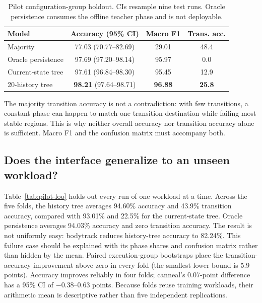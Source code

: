 \documentclass[conference,10pt]{IEEEtran}
\begin{document}
\begin{table}[t]
\centering
\caption{Pilot configuration-group holdout. CIs resample nine test runs. Oracle
persistence consumes the offline teacher phase and is not deployable.}
\label{tab:pilot-main}
\footnotesize
\begin{tabular}{lccc}
\toprule
Model & Accuracy (95\% CI) & Macro F1 & Trans. acc. \\
\midrule
Majority & 77.03 (70.77--82.69) & 29.01 & 48.4 \\
Oracle persistence & 97.69 (97.20--98.14) & 95.97 & 0.0 \\
Current-state tree & 97.61 (96.84--98.30) & 95.45 & 12.9 \\
20-history tree & \textbf{98.21} (97.64--98.71) & \textbf{96.88} & \textbf{25.8} \\
\bottomrule
\end{tabular}
\end{table}

The majority transition accuracy is not a contradiction: with few transitions, a
constant phase can happen to match one transition destination while failing most
stable regions. This is why neither overall accuracy nor transition accuracy alone is
sufficient. Macro F1 and the confusion matrix must accompany both.

\subsection{Does the interface generalize to an unseen workload?}

Table~\ref{tab:pilot-loo} holds out every run of one workload at a time. Across the
five folds, the history tree averages 94.60\% accuracy and 43.9\% transition accuracy,
compared with 93.01\% and 22.5\% for the current-state tree. Oracle persistence averages
94.03\% accuracy and zero transition accuracy. The result is not uniformly easy:
bodytrack reduces history-tree accuracy to 82.24\%. This failure case should be
explained with its phase shares and confusion matrix rather than hidden by the mean.
Paired execution-group bootstraps place the transition-accuracy improvement above zero
in every fold (the smallest lower bound is 5.9 points). Accuracy improves reliably in
four folds; canneal's 0.07-point difference has a 95\% CI of $-0.38$--0.63 points.
Because folds reuse training workloads, their arithmetic mean is descriptive rather
than five independent replications.
\end{document}
